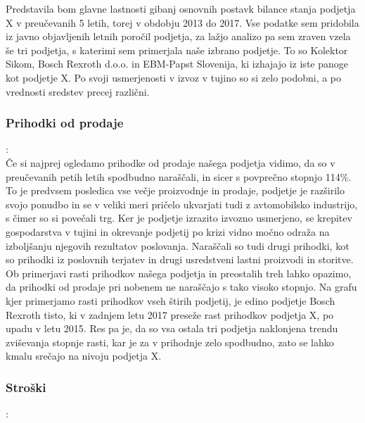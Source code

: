 \documentclass[12pt,a4paper]{amsart}
\theoremstyle{definition} %
\theoremstyle{plain} %
\begin{document}
Predstavila bom glavne lastnosti gibanj osnovnih postavk bilance stanja podjetja X v preučevanih 5 letih, torej v obdobju 2013 do 2017. Vse podatke sem pridobila iz javno objavljenih letnih poročil podjetja, za lažjo analizo pa sem zraven vzela še tri podjetja, s katerimi sem primerjala naše izbrano podjetje. To so Kolektor Sikom, Bosch Rexroth d.o.o. in EBM-Papst Slovenija, ki izhajajo iz iste panoge kot podjetje X. Po svoji usmerjenosti v izvoz v tujino so si zelo podobni, a po vrednosti sredstev precej različni.\\

\subsubsection{Prihodki od prodaje}:\\

Če si najprej ogledamo prihodke od prodaje našega podjetja vidimo, da so v preučevanih petih letih spodbudno naraščali, in sicer s povprečno stopnjo 114\%. To je predvsem posledica vse večje proizvodnje in prodaje, podjetje je razširilo svojo ponudbo in se v veliki meri pričelo ukvarjati tudi z avtomobilsko industrijo, s čimer so si povečali trg. Ker je podjetje izrazito izvozno usmerjeno, se krepitev gospodarstva v tujini in okrevanje podjetij po krizi vidno močno odraža na izboljšanju njegovih rezultatov poslovanja. Naraščali so tudi drugi prihodki, kot so prihodki iz poslovnih terjatev in drugi usredstveni lastni proizvodi in storitve. Ob primerjavi rasti prihodkov našega podjetja in preostalih treh lahko opazimo, da prihodki od prodaje pri nobenem ne naraščajo s tako visoko stopnjo. 
Na grafu kjer primerjamo rasti prihodkov vseh štirih podjetij, je edino podjetje Bosch Rexroth tisto, ki v zadnjem letu 2017 preseže rast prihodkov podjetja X, po upadu v letu 2015. Res pa je, da so vsa ostala tri podjetja naklonjena trendu zviševanja stopnje rasti, kar je za v prihodnje zelo spodbudno, zato se lahko kmalu srečajo na nivoju podjetja X.\\

\subsubsection{Stroški}:\\
\end{document}
